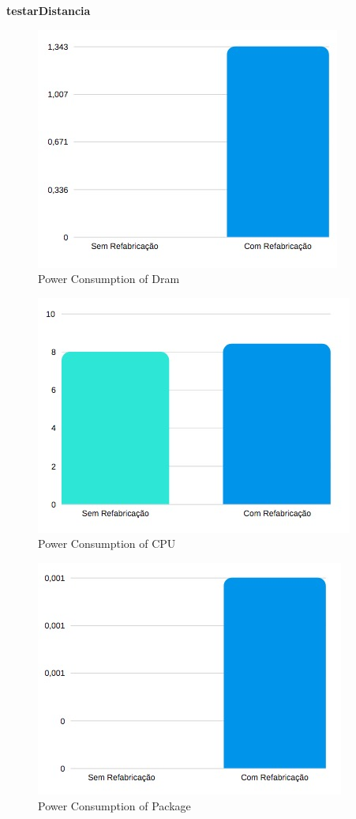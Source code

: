 \textbf{testarDistancia}

\begin{figure}[H]
    \centering
    \includegraphics[scale=0.8]{tex/img/graficos/27.jpg}
    \caption{Power Consumption of Dram}
\end{figure}

\begin{figure}[H]
    \centering
    \includegraphics[scale=0.8]{tex/img/graficos/28.jpg}
    \caption{Power Consumption of CPU}
\end{figure}

\begin{figure}[H]
    \centering
    \includegraphics[scale=0.8]{tex/img/graficos/29.jpg}
    \caption{Power Consumption of Package}
\end{figure}


